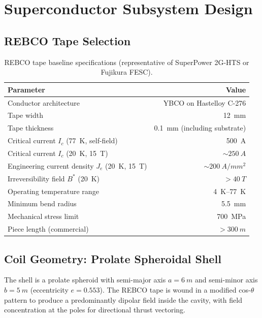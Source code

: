 \documentclass[11pt,a4paper]{article}
\begin{document}
\section{Superconductor Subsystem Design}\label{sec:sc_design}

\subsection{REBCO Tape Selection}

\begin{table}[h]
\centering
\caption{REBCO tape baseline specifications (representative of SuperPower
2G-HTS or Fujikura FESC).}
\label{tab:rebco_spec}
\begin{tabular}{@{}lr@{}}
\toprule
Parameter & Value \\
\midrule
Conductor architecture & YBCO on Hastelloy C-276 \\
Tape width & \SI{12}{mm} \\
Tape thickness & \SI{0.1}{mm} (including substrate) \\
Critical current $I_c$ (\SI{77}{K}, self-field) & \SI{500}{A} \\
Critical current $I_c$ (\SI{20}{K}, \SI{15}{T}) & $\sim\!\SI{250}{A}$ \\
Engineering current density $J_e$ (\SI{20}{K}, \SI{15}{T}) & $\sim\!\SI{200}{A/mm^2}$ \\
Irreversibility field $B^*$ (\SI{20}{K}) & $>\SI{40}{T}$ \\
Operating temperature range & \SIrange{4}{77}{K} \\
Minimum bend radius & \SI{5.5}{mm} \\
Mechanical stress limit & \SI{700}{MPa} \\
Piece length (commercial) & $>\SI{300}{m}$ \\
\bottomrule
\end{tabular}
\end{table}

\subsection{Coil Geometry: Prolate Spheroidal Shell}

The shell is a prolate spheroid with semi-major axis $a = \SI{6}{m}$ and
semi-minor axis $b = \SI{5}{m}$ (eccentricity $e = 0.553$). The REBCO tape
is wound in a modified cos-$\theta$ pattern to produce a predominantly dipolar
field inside the cavity, with field concentration at the poles for directional
thrust vectoring.
\end{document}
